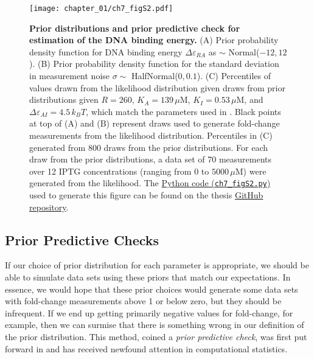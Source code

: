 \documentclass[12pt]{caltech_thesis}
\begin{document}
\hypertarget{fig:epRA_prior_pred}{%
\begin{figure}
\centering
\texttt{[image: chapter\_01/ch7\_figS2.pdf]}
\caption[{Prior distributions and prior predictive check for estimation
of the DNA binding energy.}]{\textbf{Prior distributions and prior
predictive check for estimation of the DNA binding energy.} (A) Prior
probability density function for DNA binding energy
\(\Delta\varepsilon_{RA}\) as \(\sim\) Normal(\(-12, 12\)). (B) Prior
probability density function for the standard deviation in measurement
noise \(\sigma \sim\) HalfNormal(\(0, 0.1\)). (C) Percentiles of values
drawn from the likelihood distribution given draws from prior
distributions given \(R=260\), \(K_A=139 \,\mu\)M, \(K_I=0.53\,\mu\)M,
and \(\Delta\varepsilon_{AI} = 4.5\,k_BT\), which match the parameters
used in \textcite{razo-mejia2018}. Black points at top of (A) and (B)
represent draws used to generate fold-change measurements from the
likelihood distribution. Percentiles in (C) generated from 800 draws
from the prior distributions. For each draw from the prior
distributions, a data set of 70 measurements over 12 IPTG concentrations
(ranging from \(0\) to \(5000\,\mu\)M) were generated from the
likelihood. The
\href{https://github.com/gchure/phd/blob/master/src/chapter_07/code/ch7_figS2.py}{Python
code (\texttt{ch7\_figS2.py})} used to generate this figure can be found
on the thesis \href{https://github.com/gchure/phd}{GitHub repository}.}
\label{fig:epRA_prior_pred}
\end{figure}
}

\hypertarget{prior-predictive-checks}{%
\subsection{Prior Predictive Checks}\label{prior-predictive-checks}}

If our choice of prior distribution for each parameter is appropriate,
we should be able to simulate data sets using these priors that match
our expectations. In essence, we would hope that these prior choices
would generate some data sets with fold-change measurements above 1 or
below zero, but they should be infrequent. If we end up getting
primarily negative values for fold-change, for example, then we can
surmise that there is something wrong in our definition of the prior
distribution. This method, coined a \emph{prior predictive check}, was
first put forward in \textcite{good1950} and has received newfound
attention in computational statistics.
\end{document}
